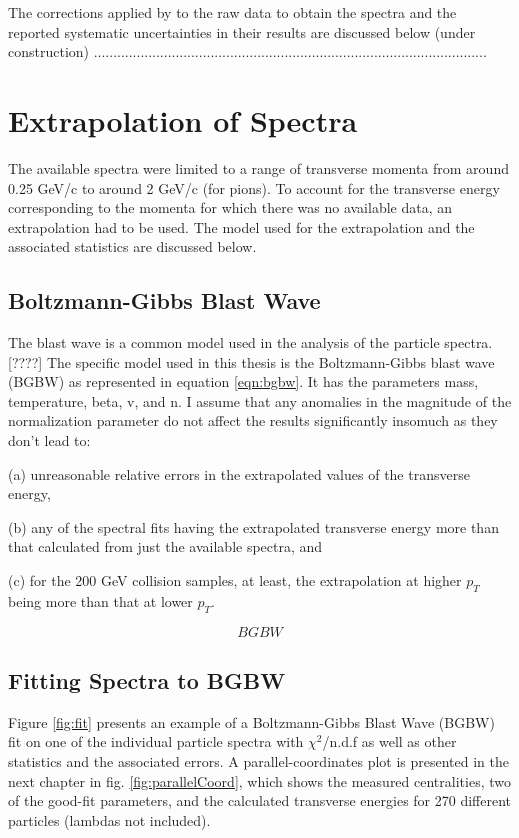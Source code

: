 The corrections applied by \citet{PhysRevC.96.044904} to the raw data to obtain the spectra and the reported systematic uncertainties in their results are discussed below (under construction)
.....................................................................................................

\section{Extrapolation of Spectra}
The available spectra were limited to a range of transverse momenta from around 0.25 GeV/c to around 2 GeV/c (for pions). To account for the transverse energy corresponding to the momenta for which there was no available data, an extrapolation had to be used. The model used for the extrapolation and the associated statistics are discussed below.

\subsection{Boltzmann-Gibbs Blast Wave}
The blast wave is a common model used in the analysis of the particle spectra.[????] The specific model used in this thesis is the Boltzmann-Gibbs blast wave (BGBW) as represented in equation \ref{eqn:bgbw}. It has the parameters mass, temperature, beta, v, and n. I assume that any anomalies in the magnitude of the normalization parameter do not affect the results significantly insomuch as they don't lead to: 

(a) unreasonable relative errors in the extrapolated values of the transverse energy,

(b) any of the spectral fits having the extrapolated transverse energy more than that calculated from just the available spectra, and

(c) for the 200 GeV collision samples, at least, the extrapolation at higher $p_{T}$ being more than that at lower $p_{T}$.

	\begin{equation}\label{eqn:BGBW}
	BGBW
	\end{equation}

\subsection{Fitting Spectra to BGBW}
Figure \ref{fig:fit} presents an example of a Boltzmann-Gibbs Blast Wave (BGBW) fit on one of the individual particle spectra with $\chi^{2}$/n.d.f as well as other statistics and the associated errors. A parallel-coordinates plot is presented in the next chapter in fig. \ref{fig:parallelCoord}, which shows the measured centralities, two of the good-fit parameters, and the calculated transverse energies for 270 different particles (lambdas not included).

